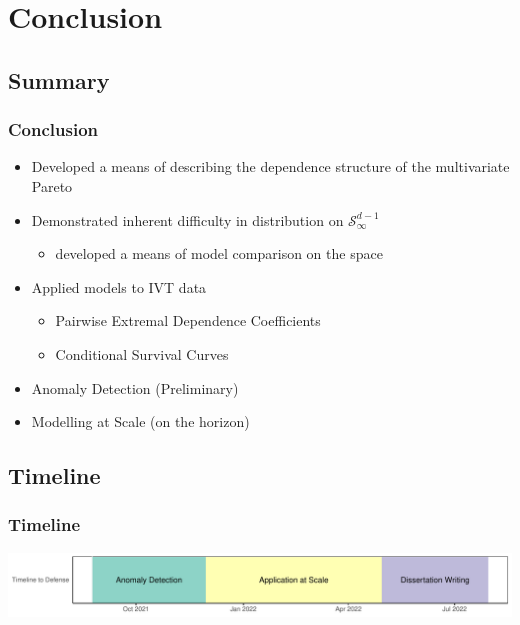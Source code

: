 \documentclass[aspectratio=169]{beamer}
\begin{document}
\section{Conclusion}

\subsection{Summary}

\begin{frame}
  \frametitle{Conclusion}
  \begin{itemize}
    \item Developed a means of describing the dependence structure of the multivariate Pareto
    \item Demonstrated inherent difficulty in distribution on $\mathcal{S}_{\infty}^{d-1}$
      \begin{itemize}
        \item developed a means of model comparison on the space
      \end{itemize}
    \item Applied models to IVT data
      \begin{itemize}
        \item Pairwise Extremal Dependence Coefficients
        \item Conditional Survival Curves
      \end{itemize}
    \item Anomaly Detection (Preliminary)
    \item Modelling at Scale (on the horizon)
  \end{itemize}
\end{frame}

\subsection{Timeline}

\begin{frame}
    \frametitle{Timeline}
    \begin{center}
        \includegraphics[width=\textwidth]{./images/timeline}
    \end{center}
\end{frame}
\end{document}
